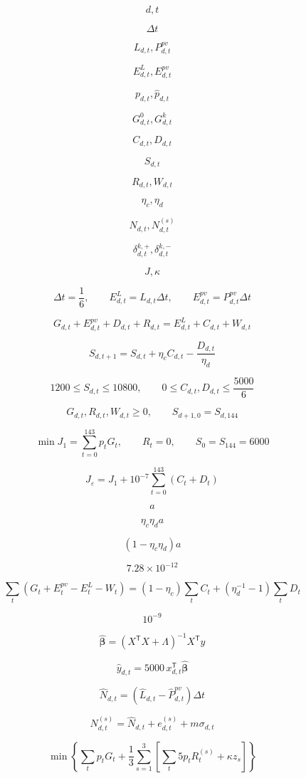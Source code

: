 \[
d,t
\]

\[
\Delta t
\]

\[
L_{d,t},P^{pv}_{d,t}
\]

\[
E^L_{d,t},E^{pv}_{d,t}
\]

\[
p_{d,t},\widehat p_{d,t}
\]

\[
G^0_{d,t},G^k_{d,t}
\]

\[
C_{d,t},D_{d,t}
\]

\[
S_{d,t}
\]

\[
R_{d,t},W_{d,t}
\]

\[
\eta_c,\eta_d
\]

\[
N_{d,t},N^{(s)}_{d,t}
\]

\[
\delta^{k,+}_{d,t},\delta^{k,-}_{d,t}
\]

\[
J,\kappa
\]

\[
\Delta t=\frac{1}{6},\qquad E^L_{d,t}=L_{d,t}\Delta t,\qquad E^{pv}_{d,t}=P^{pv}_{d,t}\Delta t
\]

\[
G_{d,t}+E^{pv}_{d,t}+D_{d,t}+R_{d,t}=E^L_{d,t}+C_{d,t}+W_{d,t}
\]

\[
S_{d,t+1}=S_{d,t}+\eta_c C_{d,t}-\frac{D_{d,t}}{\eta_d}
\]

\[
1200\leq S_{d,t}\leq10800,\qquad 0\leq C_{d,t},D_{d,t}\leq\frac{5000}{6}
\]

\[
G_{d,t},R_{d,t},W_{d,t}\geq0,\qquad S_{d+1,0}=S_{d,144}
\]

\[
\min J_1=\sum_{t=0}^{143}p_tG_t,\qquad R_t=0,\qquad S_0=S_{144}=6000
\]

\[
J_{\varepsilon}=J_1+10^{-7}\sum_{t=0}^{143}(C_t+D_t)
\]

\[
a
\]

\[
\eta_c\eta_d a
\]

\[
(1-\eta_c\eta_d)a
\]

\[
7.28\times10^{-12}
\]

\[
\sum_t(G_t+E^{pv}_t-E^L_t-W_t)=(1-\eta_c)\sum_tC_t+(\eta_d^{-1}-1)\sum_tD_t
\]

\[
10^{-9}
\]

\[
\widehat{\boldsymbol\beta}=(X^{\mathsf T}X+\Lambda)^{-1}X^{\mathsf T}y
\]

\[
\widehat y_{d,t}=5000\,x_{d,t}^{\mathsf T}\widehat{\boldsymbol\beta}
\]

\[
\widehat N_{d,t}=(\widehat L_{d,t}-\widehat P^{pv}_{d,t})\Delta t
\]

\[
N^{(s)}_{d,t}=\widehat N_{d,t}+e^{(s)}_{d,t}+m\sigma_{d,t}
\]

\[
\min\left\{\sum_t p_tG_t+\frac{1}{3}\sum_{s=1}^{3}\left[\sum_t5p_tR_t^{(s)}+\kappa z_s\right]\right\}
\]

